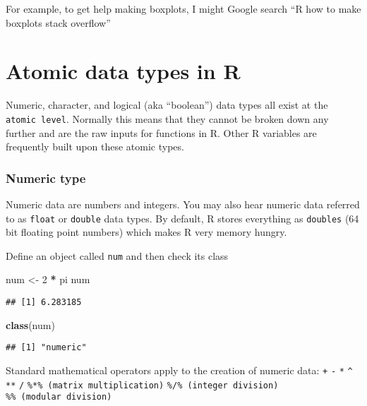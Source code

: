 \documentclass[]{article}
\newenvironment{Shaded}{\begin{snugshade}}{\end{snugshade}}
\newcommand{\KeywordTok}[1]{\textcolor[rgb]{0.13,0.29,0.53}{\textbf{#1}}}
\newcommand{\DecValTok}[1]{\textcolor[rgb]{0.00,0.00,0.81}{#1}}
\newcommand{\StringTok}[1]{\textcolor[rgb]{0.31,0.60,0.02}{#1}}
\newcommand{\OperatorTok}[1]{\textcolor[rgb]{0.81,0.36,0.00}{\textbf{#1}}}
\newcommand{\NormalTok}[1]{#1}
\begin{document}
For example, to get help making boxplots, I might Google search ``R how
to make boxplots stack overflow''

\section{Atomic data types in R}\label{atomic-data-types-in-r}

Numeric, character, and logical (aka ``boolean'') data types all exist
at the \texttt{atomic\ level}. Normally this means that they cannot be
broken down any further and are the raw inputs for functions in R. Other
R variables are frequently built upon these atomic types.

\subsubsection{Numeric type}\label{numeric-type}

Numeric data are numbers and integers. You may also hear numeric data
referred to as \texttt{float} or \texttt{double} data types. By default,
R stores everything as \texttt{doubles} (64 bit floating point numbers)
which makes R very memory hungry.

Define an object called \texttt{num} and then check its class

\begin{Shaded}
\begin{Highlighting}[]
\NormalTok{num <-}\StringTok{ }\DecValTok{2} \OperatorTok{*}\StringTok{ }\NormalTok{pi}
\NormalTok{num}
\end{Highlighting}
\end{Shaded}

\begin{verbatim}
## [1] 6.283185
\end{verbatim}

\begin{Shaded}
\begin{Highlighting}[]
\KeywordTok{class}\NormalTok{(num)}
\end{Highlighting}
\end{Shaded}

\begin{verbatim}
## [1] "numeric"
\end{verbatim}

Standard mathematical operators apply to the creation of numeric data:
\texttt{+} \texttt{-} \texttt{*} \texttt{\^{}} \texttt{**} \texttt{/}
\texttt{\%*\%\ (matrix\ multiplication)}
\texttt{\%/\%\ (integer\ division)} \texttt{\%\%\ (modular\ division)}
\end{document}
